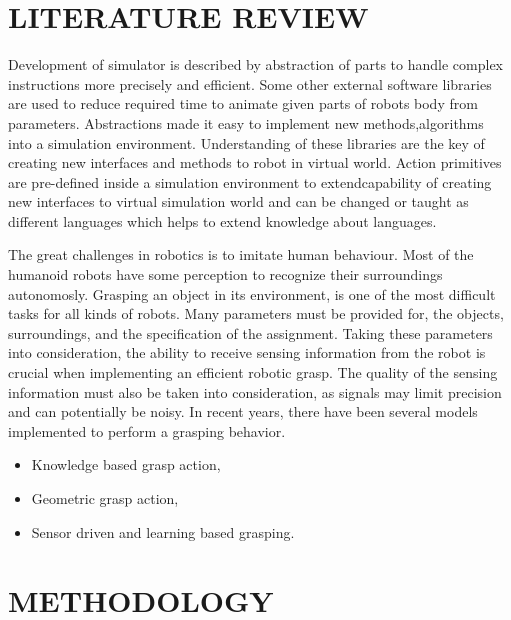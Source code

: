 \documentclass[a4paper, 11pt]{report}
\begin{document}
{\tiny}\chapter{LITERATURE REVIEW}
Development of simulator is described by abstraction of parts to handle 
complex instructions more precisely and efficient. Some other external 
software 
libraries are used to reduce required time to animate given parts of robots 
body from parameters. Abstractions made it easy to implement new 
methods,algorithms into a simulation environment. Understanding of these 
libraries are the key of creating new interfaces and methods to robot in 
virtual world. Action primitives are pre-defined inside a simulation 
environment to extendcapability of creating new interfaces to virtual 
simulation world and can be changed or taught as different languages which 
helps to extend knowledge about languages.


The great challenges in robotics is to imitate human behaviour. Most of the 
humanoid robots have some perception to recognize their surroundings 
autonomosly. Grasping an object in its environment, is one of the most 
difficult tasks for all kinds of robots. Many parameters must be provided for, 
the objects, surroundings, and the specification of the assignment. Taking 
these parameters into consideration, the ability to receive sensing information 
from the robot is crucial when implementing an efficient robotic grasp. The 
quality of the sensing information 
must also be taken into consideration, as signals may limit precision and can 
potentially be noisy. In recent years, there have been several models 
implemented to perform a grasping behavior.\cite{V. Tikhanoff, A. Cangelosi, G. 
Metta  Platform}


\begin{itemize}
\item Knowledge based grasp action,
\item Geometric grasp action,
\item Sensor driven and learning based grasping.
\end{itemize}
\chapter{METHODOLOGY}
\end{document}
